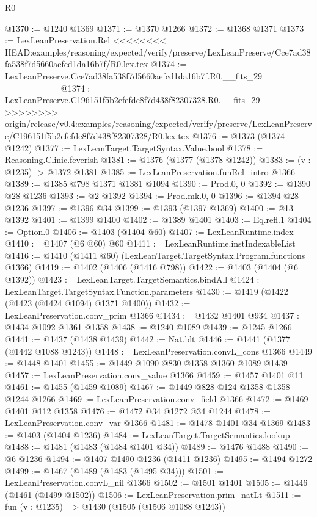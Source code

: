\begin{lexlean}{R0}
\begin{coremodule}
{{{{{{{{{{{{{{{{{{{{{{{{{{{{{{{{{{{{{{{{{{{{{{{{{{{{{{{{{{{{{{{{{{{{{{{{{{{{{{{{{{{{{{@1370 := @1240 @1369
@1371 := @1370 @1266
@1372 := @1368 @1371
@1373 := LexLeanPreservation.Rel
<<<<<<<< HEAD:examples/reasoning/expected/verify/preserve/LexLeanPreserve/Cce7ad38fa538f7d5660aefcd1da16b7f/R0.lex.tex
@1374 := LexLeanPreserve.Cce7ad38fa538f7d5660aefcd1da16b7f.R0.__fits_29
========
@1374 := LexLeanPreserve.C196151f5b2efefde8f7d438f82307328.R0.__fits_29
>>>>>>>> origin/release/v0.4:examples/reasoning/expected/verify/preserve/LexLeanPreserve/C196151f5b2efefde8f7d438f82307328/R0.lex.tex
@1376 := @1373 (@1374 @1242)
@1377 := LexLeanTarget.TargetSyntax.Value.bool
@1378 := Reasoning.Clinic.feverish
@1381 := @1376 (@1377 (@1378 @1242))
@1383 := (v : @1235) -> @1372 @1381
@1385 := LexLeanPreservation.funRel_intro @1366
@1389 := @1385 @798 @1371 @1381 @1094
@1390 := Prod.{0, 0}
@1392 := @1390 @28 @1236
@1393 := @2 @1392
@1394 := Prod.mk.{0, 0}
@1396 := @1394 @28 @1236
@1397 := @1396 @34
@1399 := @1393 (@1397 @1369)
@1400 := @13 @1392
@1401 := @1399 @1400
@1402 := @1389 @1401
@1403 := Eq.refl.{1}
@1404 := Option.{0}
@1406 := @1403 (@1404 @60)
@1407 := LexLeanRuntime.index
@1410 := @1407 (@6 @60) @60
@1411 := LexLeanRuntime.instIndexableList
@1416 := @1410 (@1411 @60) (LexLeanTarget.TargetSyntax.Program.functions @1366)
@1419 := @1402 (@1406 (@1416 @798))
@1422 := @1403 (@1404 (@6 @1392))
@1423 := LexLeanTarget.TargetSemantics.bindAll
@1424 := LexLeanTarget.TargetSyntax.Function.parameters
@1430 := @1419 (@1422 (@1423 (@1424 @1094) @1371 @1400))
@1432 := LexLeanPreservation.conv_prim @1366
@1434 := @1432 @1401 @934
@1437 := @1434 @1092 @1361 @1358
@1438 := @1240 @1089
@1439 := @1245 @1266
@1441 := @1437 (@1438 @1439)
@1442 := Nat.blt
@1446 := @1441 (@1377 (@1442 @1088 @1243))
@1448 := LexLeanPreservation.convL_cons @1366
@1449 := @1448 @1401
@1455 := @1449 @1090 @830 @1358 @1360 @1089 @1439
@1457 := LexLeanPreservation.conv_value @1366
@1459 := @1457 @1401 @11
@1461 := @1455 (@1459 @1089)
@1467 := @1449 @828 @124 @1358 @1358 @1244 @1266
@1469 := LexLeanPreservation.conv_field @1366
@1472 := @1469 @1401 @112 @1358
@1476 := @1472 @34 @1272 @34 @1244
@1478 := LexLeanPreservation.conv_var @1366
@1481 := @1478 @1401 @34 @1369
@1483 := @1403 (@1404 @1236)
@1484 := LexLeanTarget.TargetSemantics.lookup
@1488 := @1481 (@1483 (@1484 @1401 @34))
@1489 := @1476 @1488
@1490 := @6 @1236
@1494 := @1407 @1490 @1236 (@1411 @1236)
@1495 := @1494 @1272
@1499 := @1467 (@1489 (@1483 (@1495 @34)))
@1501 := LexLeanPreservation.convL_nil @1366
@1502 := @1501 @1401
@1505 := @1446 (@1461 (@1499 @1502))
@1506 := LexLeanPreservation.prim_natLt
@1511 := fun (v : @1235) => @1430 (@1505 (@1506 @1088 @1243))
}}}}}}}}}}}}}}}}}}}}}}}}}}}}}}}}}}}}}}}}}}}}}}}}}}}}}}}}}}}}}}}}}}}}}}}}}}}}}}}}}}}}}}
\end{coremodule}
\end{lexlean}
